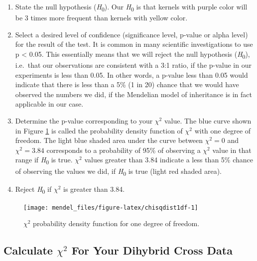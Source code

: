 \documentclass[]{book}
\providecommand{\tightlist}{%
  \setlength{\itemsep}{0pt}\setlength{\parskip}{0pt}}
\begin{document}
\begin{enumerate}
\def\labelenumi{\arabic{enumi}.}
\tightlist
\item
  State the null hypothesis (\emph{H}\textsubscript{0}). Our \emph{H}\textsubscript{0} is that kernels with purple color will be 3 times more frequent than kernels with yellow color.
\item
  Select a desired level of confidence (significance level, p-value or alpha level) for the result of the test. It is common in many scientific investigations to use p \textless{} 0.05. This essentially means that we will reject the null hypothesis (\emph{H}\textsubscript{0}), i.e.~that our observations are consistent with a 3:1 ratio, if the p-value in our experiments is less than 0.05. In other words, a p-value less than 0.05 would indicate that there is less than a 5\% (1 in 20) chance that we would have observed the numbers we did, if the Mendelian model of inheritance is in fact applicable in our case.
\item
  Determine the p-value corresponding to your \(\chi^2\) value. The blue curve shown in Figure \ref{fig:chisqdist1df} is called the probability density function of \(\chi^2\) with one degree of freedom. The light blue shaded area under the curve between \(\chi^2=0\) and \(\chi^2=3.84\) corresponds to a probability of 95\% of observing a \(\chi^2\) value in that range if \emph{H}\textsubscript{0} is true. \(\chi^2\) values greater than 3.84 indicate a less than 5\% chance of observing the values we did, if \emph{H}\textsubscript{0} is true (light red shaded area).
\item
  Reject \emph{H}\textsubscript{0} if \(\chi^2\) is greater than 3.84.
\end{enumerate}



\begin{figure}

{\centering \texttt{[image: mendel\_files/figure-latex/chisqdist1df-1]} 

}

\caption{\(\chi^2\) probability density function for one degree of freedom.}\label{fig:chisqdist1df}
\end{figure}

\hypertarget{calculate-chi2-for-your-dihybrid-cross-data}{%
\subsection{\texorpdfstring{Calculate \(\chi^2\) For Your Dihybrid Cross Data}{Calculate \textbackslash{}chi\^{}2 For Your Dihybrid Cross Data}}\label{calculate-chi2-for-your-dihybrid-cross-data}}
\end{document}

